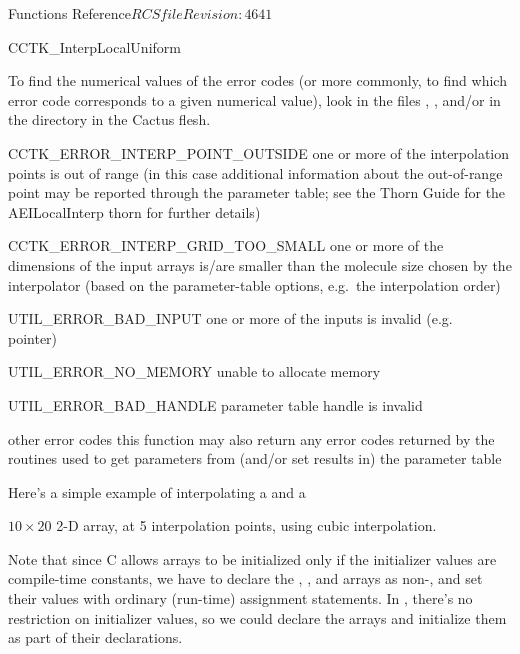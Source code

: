 \begin{cactuspart}{ Functions Reference}{$RCSfile$}{$Revision: 4641 $}
\begin{FunctionDescription}{CCTK\_InterpLocalUniform}
\begin{ErrorSection}
\begin{Error}{}
To find the numerical
values of the error codes (or more commonly, to find which error code
corresponds to a given numerical value), look in the files
, , and/or 
in the  directory in the Cactus flesh.
\end{Error}
\begin{Error}{CCTK\_ERROR\_INTERP\_POINT\_OUTSIDE}
one or more of the interpolation points is out of range
(in this case additional information about the out-of-range point
may be reported through the parameter table; see the Thorn Guide for
the AEILocalInterp thorn for further details)
\end{Error}
\begin{Error}{CCTK\_ERROR\_INTERP\_GRID\_TOO\_SMALL}
one or more of the dimensions of the input arrays is/are smaller than
the molecule size chosen by the interpolator (based on the parameter-table
options, e.g.\ the interpolation order)
\end{Error}
\begin{Error}{UTIL\_ERROR\_BAD\_INPUT}
one or more of the inputs is invalid (e.g.~ pointer)
\end{Error}
\begin{Error}{UTIL\_ERROR\_NO\_MEMORY}
unable to allocate memory
\end{Error}
\begin{Error}{UTIL\_ERROR\_BAD\_HANDLE}
parameter table handle is invalid
\end{Error}
\begin{Error}{other error codes}
this function may also return any error codes returned by the
 routines used to get parameters from
(and/or set results in) the parameter table
\end{Error}
\end{ErrorSection}

\begin{ExampleSection}
\begin{ExampleDescription}
Here's a simple example of interpolating a  and a
\end{ExampleDescription}
 $10 \times 20$ 2-D array, at 5 interpolation points,
using cubic interpolation.

Note that since C allows arrays to be initialized only if the
initializer values are compile-time constants, we have to declare the
, , and 
arrays as non-, and set their values with ordinary (run-time)
assignment statements.  In \Cplusplus, there's no restriction on
initializer values, so we could declare the arrays  and
initialize them as part of their declarations.


\end{ExampleSection}
\end{FunctionDescription}
\end{cactuspart}
